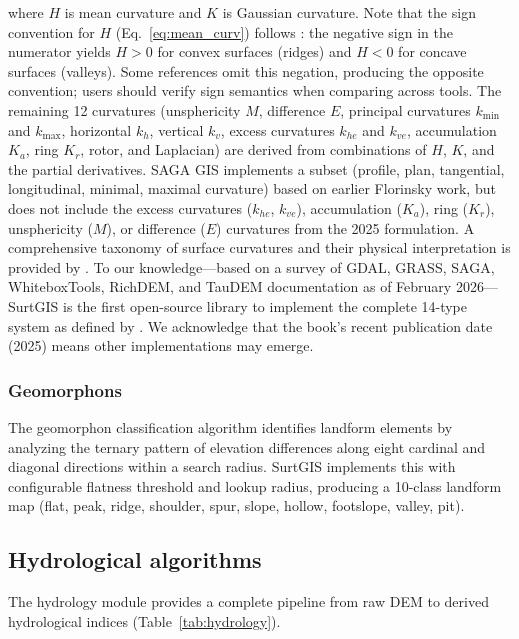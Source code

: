 \documentclass[preprint,review,12pt,authoryear]{elsarticle}
\begin{document}
\noindent where $H$ is mean curvature and $K$ is Gaussian curvature. Note that the sign convention for $H$ (Eq.~\ref{eq:mean_curv}) follows \citet{florinsky2025}: the negative sign in the numerator yields $H > 0$ for convex surfaces (ridges) and $H < 0$ for concave surfaces (valleys). Some references omit this negation, producing the opposite convention; users should verify sign semantics when comparing across tools. The remaining 12 curvatures (unsphericity $M$, difference $E$, principal curvatures $k_{\min}$ and $k_{\max}$, horizontal $k_h$, vertical $k_v$, excess curvatures $k_{he}$ and $k_{ve}$, accumulation $K_a$, ring $K_r$, rotor, and Laplacian) are derived from combinations of $H$, $K$, and the partial derivatives. SAGA GIS implements a subset (profile, plan, tangential, longitudinal, minimal, maximal curvature) based on earlier Florinsky work, but does not include the excess curvatures ($k_{he}$, $k_{ve}$), accumulation ($K_a$), ring ($K_r$), unsphericity ($M$), or difference ($E$) curvatures from the 2025 formulation. A comprehensive taxonomy of surface curvatures and their physical interpretation is provided by \citet{minar2020}. To our knowledge---based on a survey of GDAL, GRASS, SAGA, WhiteboxTools, RichDEM, and TauDEM documentation as of February 2026---SurtGIS is the first open-source library to implement the complete 14-type system as defined by \citet{florinsky2025}. We acknowledge that the book's recent publication date (2025) means other implementations may emerge.

\subsubsection{Geomorphons}

The geomorphon classification algorithm \citep{jasiewicz2013} identifies landform elements by analyzing the ternary pattern of elevation differences along eight cardinal and diagonal directions within a search radius. SurtGIS implements this with configurable flatness threshold and lookup radius, producing a 10-class landform map (flat, peak, ridge, shoulder, spur, slope, hollow, footslope, valley, pit).

\subsection{Hydrological algorithms}
\label{subsec:hydrology}

The hydrology module provides a complete pipeline from raw DEM to derived hydrological indices (Table~\ref{tab:hydrology}).
\end{document}

